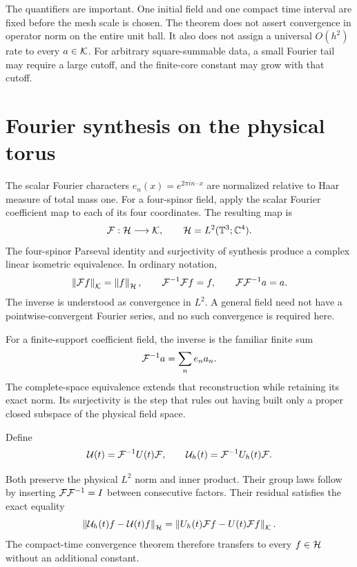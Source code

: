 The quantifiers are important. One initial field and one compact time interval are fixed before the mesh scale is chosen. The theorem does not assert convergence in operator norm on the entire unit ball. It also does not assign a universal $O(h^2)$ rate to every $a\in\mathcal K$. For arbitrary square-summable data, a small Fourier tail may require a large cutoff, and the finite-core constant may grow with that cutoff.


\section{Fourier synthesis on the physical torus}
The scalar Fourier characters $e_n(x)=e^{2\pi i n\cdot x}$ are normalized relative to Haar measure of total mass one. For a four-spinor field, apply the scalar Fourier coefficient map to each of its four coordinates. The resulting map is
\[
\mathcal F:\mathcal H\longrightarrow\mathcal K,
\qquad \mathcal H=L^2(\mathbb T^3;\mathbb C^4).
\]
The four-spinor Parseval identity and surjectivity of synthesis produce a complex linear isometric equivalence. In ordinary notation,
\[
\left\lVert\mathcal F f\right\rVert_{\mathcal K}=\left\lVert f\right\rVert_{\mathcal H},\qquad
\mathcal F^{-1}\mathcal F f=f,\qquad \mathcal F\mathcal F^{-1}a=a.
\]
The inverse is understood as convergence in $L^2$. A general field need not have a pointwise-convergent Fourier series, and no such convergence is required here.

For a finite-support coefficient field, the inverse is the familiar finite sum
\[
\mathcal F^{-1}a=\sum_n e_na_n.
\]
The complete-space equivalence extends that reconstruction while retaining its exact norm. Its surjectivity is the step that rules out having built only a proper closed subspace of the physical field space.

\begin{definition}
Define
\[
\mathcal U(t)=\mathcal F^{-1}U(t)\mathcal F,
\qquad
\mathcal U_h(t)=\mathcal F^{-1}U_h(t)\mathcal F.
\]
\end{definition}
Both preserve the physical $L^2$ norm and inner product. Their group laws follow by inserting $\mathcal F\mathcal F^{-1}=I$ between consecutive factors. Their residual satisfies the exact equality
\[
\left\lVert\mathcal U_h(t)f-\mathcal U(t)f\right\rVert_{\mathcal H}
=\left\lVert U_h(t)\mathcal F f-U(t)\mathcal F f\right\rVert_{\mathcal K}.
\]
The compact-time convergence theorem therefore transfers to every $f\in\mathcal H$ without an additional constant.


